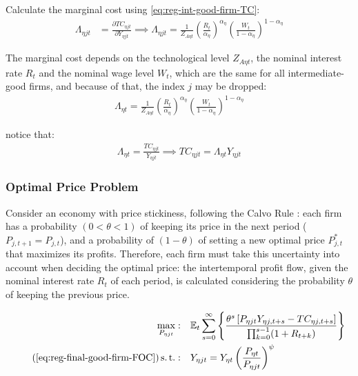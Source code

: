 \documentclass[
	thesis.tex
	]{subfiles}
\begin{document}

Calculate the marginal cost using \ref{eq:reg-int-good-firm-TC}: 
\begin{align}
	\Lambda_{\eta jt} & = \frac{\partial TC_{\eta jt}}{\partial Y_{\eta jt}} \implies 
	\Lambda_{\eta jt} = \frac{1}{Z_{A\eta t}} \left( \frac{R_t}{{\alpha_\eta}} \right)^{{\alpha_\eta}} \left( \frac{W_t}{1-{\alpha_\eta}} \right)^{1-{\alpha_\eta}} \label{eq:reg-int-good-firm-MC}
\end{align}

The marginal cost depends on the technological level $Z_{A\eta t}$, the nominal interest rate $R_t$ and the nominal wage level $W_t$, which are the same for all intermediate-good firms, and because of that, the index $j$ may be dropped:
\begin{align}
	\label{eq:reg-int-good-firm-MC-2}
	\Lambda_{\eta t} = \frac{1}{Z_{A\eta t}} \left( \frac{R_t}{{\alpha_\eta}} \right)^{{\alpha_\eta}} \left( \frac{W_t}{1-{\alpha_\eta}} \right)^{1-{\alpha_\eta}}
\end{align}

notice that:
\begin{align}
	\label{eq:reg-int-good-firm-TC-MC}
	\Lambda_{\eta t} = \frac{TC_{\eta jt}}{Y_{\eta jt}} \implies 
	TC_{\eta jt} = \Lambda_{\eta t} Y_{\eta jt}
\end{align}


\subsubsection*{Optimal Price Problem}

Consider an economy with price stickiness, following the Calvo Rule \cite{calvo_staggered_1983}: each firm has a probability $(0 < \theta < 1)$ of keeping its price in the next period ($P_{j,t+1} = P_{j,t}$), and a probability of $(1 - \theta)$ of setting a new optimal price $P_{j,t}^\ast$ that maximizes its profits. Therefore, each firm must take this uncertainty into account when deciding the optimal price: the intertemporal profit flow, given the nominal interest rate $R_t$ of each period, is calculated considering the probability $\theta$ of keeping the previous price.

\begin{align}
	\label{eq:reg-int-good-firm-optimal-price-problem}
	\max_{P_{\eta jt}}: & \quad \E \sum_{s=0}^{\infty} \left\{ \frac{ \theta^s \left[ P_{\eta jt} Y_{\eta j,t+s} - TC_{\eta j,t+s} \right] }{\prod_{k=0}^{s-1}(1+R_{t+k})} \right\} \\
	\tag{\ref{eq:reg-final-good-firm-FOC}}
	\st: & \quad Y_{\eta jt} = Y_{\eta t} \left( \frac{P_{\eta t}}{P_{\eta jt}} \right)^{\psi}
\end{align}
\end{document}
